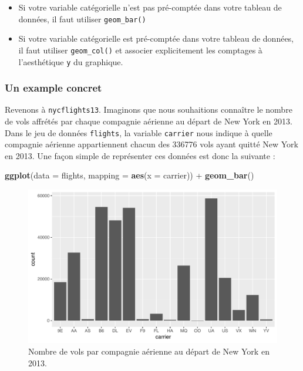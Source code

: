 \documentclass[a4paperpaper,]{article}
\newenvironment{Shaded}{\begin{snugshade}}{\end{snugshade}}
\newcommand{\DataTypeTok}[1]{\textcolor[rgb]{0.00,0.34,0.68}{#1}}
\newcommand{\KeywordTok}[1]{\textcolor[rgb]{0.12,0.11,0.11}{\textbf{#1}}}
\newcommand{\NormalTok}[1]{\textcolor[rgb]{0.12,0.11,0.11}{#1}}
\newcommand{\OperatorTok}[1]{\textcolor[rgb]{0.12,0.11,0.11}{#1}}
\newcommand{\StringTok}[1]{\textcolor[rgb]{0.75,0.01,0.01}{#1}}
\providecommand{\tightlist}{%
  \setlength{\itemsep}{0pt}\setlength{\parskip}{0pt}}
\theoremstyle{definition}
\theoremstyle{definition}
\theoremstyle{definition}
\theoremstyle{remark}
\begin{document}
\begin{itemize}
\tightlist
\item
  Si votre variable catégorielle n'est pas pré-comptée dans votre
  tableau de données, il faut utiliser \texttt{geom\_bar()}
\item
  Si votre variable catégorielle est pré-comptée dans votre tableau de
  données, il faut utiliser \texttt{geom\_col()} et associer
  explicitement les comptages à l'aesthétique \texttt{y} du graphique.
\end{itemize}

\hypertarget{un-example-concret}{%
\subsubsection{Un example concret}\label{un-example-concret}}

Revenons à \texttt{nycflights13}. Imaginons que nous souhaitions
connaître le nombre de vols affrétés par chaque compagnie aérienne au
départ de New York en 2013. Dans le jeu de données \texttt{flights}, la
variable \texttt{carrier} nous indique à quelle compagnie aérienne
appartiennent chacun des 336776 vols ayant quitté New York en 2013. Une
façon simple de représenter ces données est donc la suivante :

\begin{Shaded}
\begin{Highlighting}[]
\KeywordTok{ggplot}\NormalTok{(}\DataTypeTok{data =}\NormalTok{ flights, }\DataTypeTok{mapping =} \KeywordTok{aes}\NormalTok{(}\DataTypeTok{x =}\NormalTok{ carrier)) }\OperatorTok{+}
\StringTok{  }\KeywordTok{geom_bar}\NormalTok{()}
\end{Highlighting}
\end{Shaded}

\begin{figure}[htpb]

{\centering \includegraphics[width=0.9\linewidth]{figure/bpcarrier-1} 

}

\caption{Nombre de vols par compagnie aérienne au départ de New York en 2013.}\label{fig:bpcarrier}
\end{figure}
\end{document}
